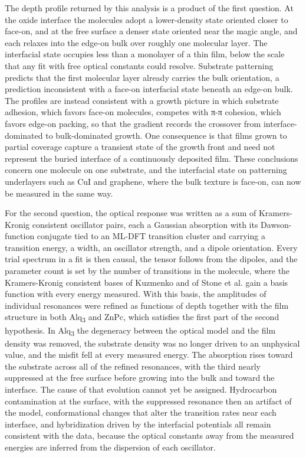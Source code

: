 The depth profile returned by this analysis is a product of the first question. At the oxide interface the molecules adopt a lower-density state oriented closer to face-on, and at the free surface a denser state oriented near the magic angle, and each relaxes into the edge-on bulk over roughly one molecular layer. The interfacial state occupies less than a monolayer of a thin film, below the scale that any fit with free optical constants could resolve. Substrate patterning predicts that the first molecular layer already carries the bulk orientation, a prediction inconsistent with a face-on interfacial state beneath an edge-on bulk. The profiles are instead consistent with a growth picture in which substrate adhesion, which favors face-on molecules, competes with π-π cohesion, which favors edge-on packing, so that the gradient records the crossover from interface-dominated to bulk-dominated growth. One consequence is that films grown to partial coverage capture a transient state of the growth front and need not represent the buried interface of a continuously deposited film. These conclusions concern one molecule on one substrate, and the interfacial state on patterning underlayers such as CuI and graphene, where the bulk texture is face-on, can now be measured in the same way.

For the second question, the optical response was written as a sum of Kramers-Kronig consistent oscillator pairs, each a Gaussian absorption with its Dawson-function conjugate tied to an ML-DFT transition cluster and carrying a transition energy, a width, an oscillator strength, and a dipole orientation. Every trial spectrum in a fit is then causal, the tensor follows from the dipoles, and the parameter count is set by the number of transitions in the molecule, where the Kramers-Kronig consistent bases of Kuzmenko and of Stone et al. gain a basis function with every energy measured. With this basis, the amplitudes of individual resonances were refined as functions of depth together with the film structure in both Alq\textsubscript{3} and ZnPc, which satisfies the first part of the second hypothesis. In Alq\textsubscript{3} the degeneracy between the optical model and the film density was removed, the substrate density was no longer driven to an unphysical value, and the misfit fell at every measured energy. The absorption rises toward the substrate across all of the refined resonances, with the third nearly suppressed at the free surface before growing into the bulk and toward the interface. The cause of that evolution cannot yet be assigned. Hydrocarbon contamination at the surface, with the suppressed resonance then an artifact of the model, conformational changes that alter the transition rates near each interface, and hybridization driven by the interfacial potentials all remain consistent with the data, because the optical constants away from the measured energies are inferred from the dispersion of each oscillator.


